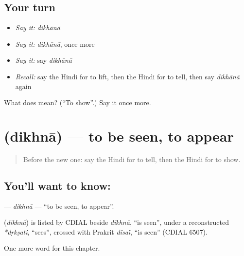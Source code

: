 \subsection*{Your turn}
\begin{itemize}
\raggedright
  \item \emph{Say it:} \emph{dikhānā}
  \item \emph{Say it:} \emph{dikhānā}, once more
  \item \emph{Say it:} say \emph{dikhānā}
  \item \emph{Recall:} say the Hindi for to lift, then the Hindi for to tell, then say \emph{dikhānā} again
\end{itemize}

\begin{tcolorbox}[breakable,colback=teal!4,colframe=teal!35!black,title={Before you move on}]
What does  mean? (\textquotedblleft{}To show\textquotedblright{}.) Say it once more.
\end{tcolorbox}
\section[\texorpdfstring{\hi{दिखना} (dikhnā)}{दिखना (dikhnā)}]{ (dikhnā) — to be seen, to appear}

\label{lesson:HI-C171-dikhna}



\begin{quote}
Before the new one: say the Hindi for to tell, then the Hindi for to show.
\end{quote}

\subsection*{You'll want to know: }
\textbf{} — \emph{dikhnā} — \textquotedblleft{}to be seen, to appear\textquotedblright{}.

\begin{cousinweb}
\textbf{} (\emph{dikhnā}) is listed by CDIAL beside \emph{dīkhnā}, \textquotedblleft{}is seen\textquotedblright{}, under a reconstructed \emph{*dṛkṣati}, \textquotedblleft{}sees\textquotedblright{}, crossed with Prakrit \emph{dīsaï}, \textquotedblleft{}is seen\textquotedblright{} (CDIAL 6507).
\end{cousinweb}

\begin{grammarlens}[title={What you've built}]
One more word for this chapter.
\end{grammarlens}

